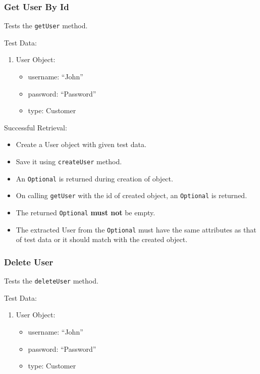 \documentclass[]{article}
\providecommand{\tightlist}{%
  \setlength{\itemsep}{0pt}\setlength{\parskip}{0pt}}
\begin{document}
\hypertarget{get-user-by-id}{%
\subsubsection{Get User By Id}\label{get-user-by-id}}

Tests the \texttt{getUser} method.

Test Data:

\begin{enumerate}
\def\labelenumi{\arabic{enumi}.}
\tightlist
\item
  User Object:

  \begin{itemize}
  \tightlist
  \item
    username: ``John''
  \item
    password: ``Password''
  \item
    type: Customer
  \end{itemize}
\end{enumerate}

Successful Retrieval:

\begin{itemize}
\tightlist
\item
  Create a User object with given test data.
\item
  Save it using \texttt{createUser} method.
\item
  An \texttt{Optional} is returned during creation of object.
\item
  On calling \texttt{getUser} with the id of created object, an
  \texttt{Optional} is returned.
\item
  The returned \texttt{Optional} \textbf{must not} be empty.
\item
  The extracted User from the \texttt{Optional} must have the same
  attributes as that of test data or it should match with the created
  object.
\end{itemize}

\hypertarget{delete-user}{%
\subsubsection{Delete User}\label{delete-user}}

Tests the \texttt{deleteUser} method.

Test Data:

\begin{enumerate}
\def\labelenumi{\arabic{enumi}.}
\tightlist
\item
  User Object:

  \begin{itemize}
  \tightlist
  \item
    username: ``John''
  \item
    password: ``Password''
  \item
    type: Customer
  \end{itemize}
\end{enumerate}
\end{document}
